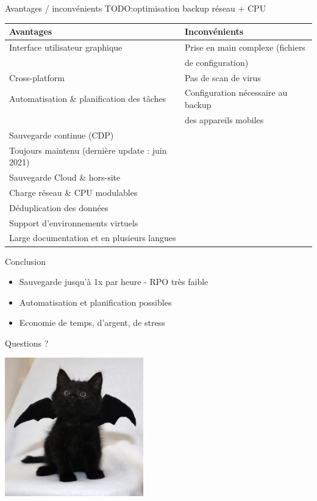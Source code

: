 \documentclass[aspectratio=169]{beamer}
\newcommand{\TODO}{TODO:}
\begin{document}
\begin{frame}{Avantages / inconvénients}
 \TODO optimisation backup réseau + CPU
    \begin{center}
     \begin{tabular}{|l|l|}
     \hline
      \textbf{Avantages} & \textbf{Inconvénients} \\
     \hline
     \hline
        Interface utilisateur graphique & Prise en main complexe (fichiers \\ 
                                        & de configuration) \\
     \hline
     Cross-platform & Pas de scan de virus \\
     \hline
     Automatisation \& planification des tâches & Configuration nécessaire au backup \\ 
                                                & des appareils mobiles\\
     \hline
     Sauvegarde continue (CDP) & \\
     \hline
     Toujours maintenu (dernière update : juin 2021) & \\
     \hline
     Sauvegarde Cloud \& hors-site & \\
     \hline
     Charge réseau \& CPU modulables & \\
     \hline
     Déduplication des données & \\
     \hline
     Support d'environnements virtuels & \\
     \hline
     Large documentation et en plusieurs langues & \\
     \hline
     \end{tabular}

    \end{center}

\end{frame}

\begin{frame}{Conclusion}
 \begin{itemize}
  \item Sauvegarde jusqu'à 1x par heure - RPO très faible
  \item Automatisation et planification possibles
  \item Economie de temps, d'argent, de stress
 \end{itemize}
\end{frame}

\begin{frame}{Questions ?}
  \begin{center}
    \includegraphics[height=60mm]{bat_kitty.jpg}
  \end{center}  
\end{frame}
\end{document}
